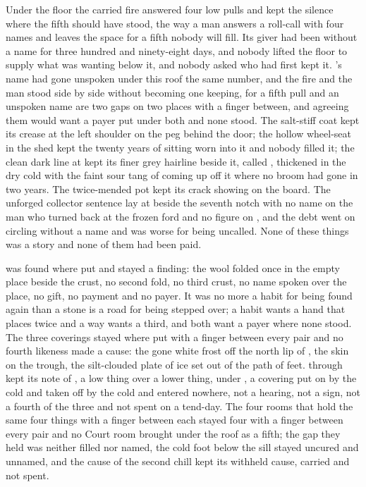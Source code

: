 \scenebreak

Under the floor the carried fire answered four low pulls and kept the silence where the fifth should have stood, the way a man answers a roll-call with four names and leaves the space for a fifth nobody will fill. Its giver had been without a name for three hundred and ninety-eight days, and nobody lifted the floor to supply what was wanting below it, and nobody asked who had first kept it. 's name had gone unspoken under this roof the same number, and the fire and the man stood side by side without becoming one keeping, for a fifth pull and an unspoken name are two gaps on two places with a finger between, and agreeing them would want a payer put under both and none stood. The salt-stiff coat kept its crease at the left shoulder on the peg behind the door; the hollow wheel-seat in the shed kept the twenty years of sitting worn into it and nobody filled it; the clean dark line at  kept its finer grey hairline beside it, called , thickened in the dry cold with the faint sour tang of  coming up off it where no broom had gone in two years. The twice-mended pot kept its crack showing on the board. The unforged collector sentence lay at  beside the seventh notch with no name on the man who turned back at the frozen ford and no figure on , and the debt went on circling without a name and was worse for being uncalled. None of these things was a story and none of them had been paid.

 was found where put and stayed a finding: the wool folded once in the empty place beside the crust, no second fold, no third crust, no name spoken over the place, no gift, no payment and no payer. It was no more a habit for being found again than a stone is a road for being stepped over; a habit wants a hand that places twice and a way wants a third, and both want a payer where none stood. The three coverings stayed where put with a finger between every pair and no fourth likeness made a cause: the gone white frost off the north lip of , the skin on the trough, the silt-clouded plate of ice set out of the path of feet.  through  kept its note of , a low thing over a lower thing, under , a covering put on by the cold and taken off by the cold and entered nowhere, not a hearing, not a sign, not a fourth of the three and not spent on a tend-day. The four rooms that hold the same four things with a finger between each stayed four with a finger between every pair and no Court room brought under the roof as a fifth; the gap they held was neither filled nor named, the cold foot below the sill stayed uncured and unnamed, and the cause of the second chill kept its withheld cause, carried and not spent.

